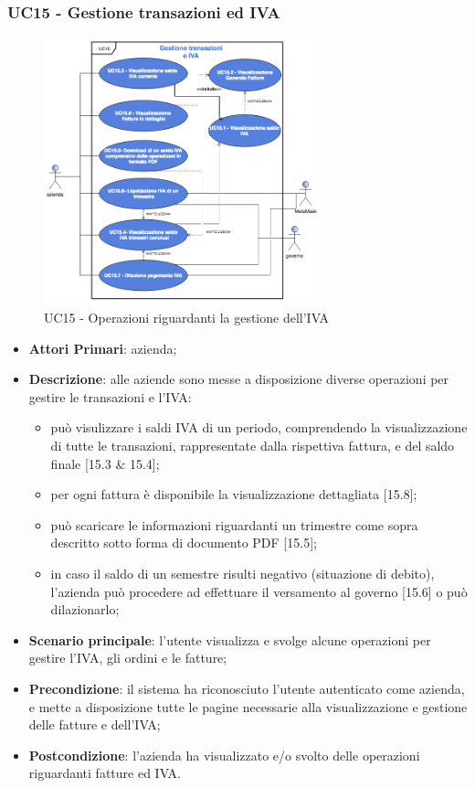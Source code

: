 \subsubsection{UC15 - Gestione transazioni ed IVA}
\begin{figure}[H]
	\includegraphics[width=8cm]{res/images/UC15-OK.png}
	\centering
	\caption{UC15 - Operazioni riguardanti la gestione dell'IVA}
\end{figure}
\begin{itemize}
	\item \textbf{Attori Primari}: azienda;
	\item \textbf{Descrizione}: alle aziende sono messe a disposizione diverse operazioni per gestire le transazioni e l'IVA:
	\begin{itemize}
		\item può visulizzare i saldi IVA di un periodo, comprendendo la visualizzazione di tutte le transazioni, rappresentate dalla rispettiva fattura, e del saldo finale [15.3 \& 15.4];
		\item per ogni fattura è disponibile la visualizzazione dettagliata [15.8];
		\item può scaricare le informazioni riguardanti un trimestre come sopra descritto sotto forma di documento PDF [15.5]; 
		\item in caso il saldo di un semestre risulti negativo (situazione di debito), l'azienda può procedere ad effettuare il versamento al governo [15.6] o può dilazionarlo\glosp [15.7];
	\end{itemize}
	\item \textbf{Scenario principale}: l'utente visualizza e svolge alcune operazioni per gestire l'IVA, gli ordini e le fatture;
	\item \textbf{Precondizione}: il sistema ha riconosciuto l'utente autenticato come azienda, e mette a disposizione tutte le pagine necessarie alla visualizzazione e gestione delle fatture e dell'IVA;
	\item \textbf{Postcondizione}: l'azienda ha visualizzato e/o svolto delle operazioni riguardanti fatture ed IVA.
\end{itemize} 
